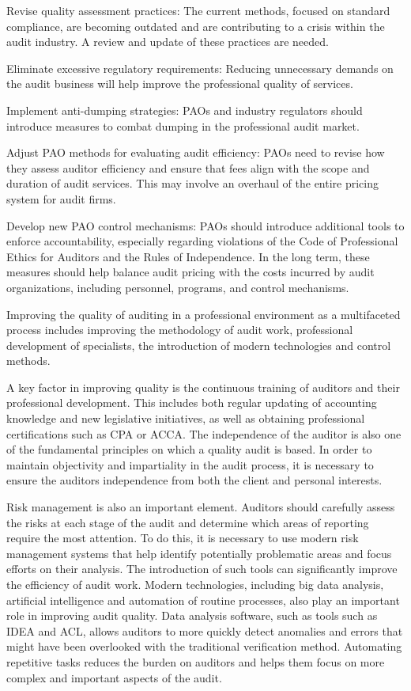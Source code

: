 \begin{multicols}{2}
Revise quality assessment practices: The current methods, focused on
standard compliance, are becoming outdated and are contributing to a
crisis within the audit industry. A review and update of these practices
are needed.

Eliminate excessive regulatory requirements: Reducing unnecessary
demands on the audit business will help improve the professional quality
of services.

Implement anti-dumping strategies: PAOs and industry regulators should
introduce measures to combat dumping in the professional audit market.

Adjust PAO methods for evaluating audit efficiency: PAOs need to revise
how they assess auditor efficiency and ensure that fees align with the
scope and duration of audit services. This may involve an overhaul of
the entire pricing system for audit firms.

Develop new PAO control mechanisms: PAOs should introduce additional
tools to enforce accountability, especially regarding violations of the
Code of Professional Ethics for Auditors and the Rules of Independence.
In the long term, these measures should help balance audit pricing with
the costs incurred by audit organizations, including personnel,
programs, and control mechanisms.

Improving the quality of auditing in a professional environment as a
multifaceted process includes improving the methodology of audit work,
professional development of specialists, the introduction of modern
technologies and control methods.

A key factor in improving quality is the continuous training of auditors
and their professional development. This includes both regular updating
of accounting knowledge and new legislative initiatives, as well as
obtaining professional certifications such as CPA or ACCA. The
independence of the auditor is also one of the fundamental principles on
which a quality audit is based. In order to maintain objectivity and
impartiality in the audit process, it is necessary to ensure the
auditor\textquotesingle s independence from both the client and personal
interests.

Risk management is also an important element. Auditors should carefully
assess the risks at each stage of the audit and determine which areas of
reporting require the most attention. To do this, it is necessary to use
modern risk management systems that help identify potentially
problematic areas and focus efforts on their analysis. The introduction
of such tools can significantly improve the efficiency of audit work.
Modern technologies, including big data analysis, artificial
intelligence and automation of routine processes, also play an important
role in improving audit quality. Data analysis software, such as tools
such as IDEA and ACL, allows auditors to more quickly detect anomalies
and errors that might have been overlooked with the traditional
verification method. Automating repetitive tasks reduces the burden on
auditors and helps them focus on more complex and important aspects of
the audit.


\end{multicols}
